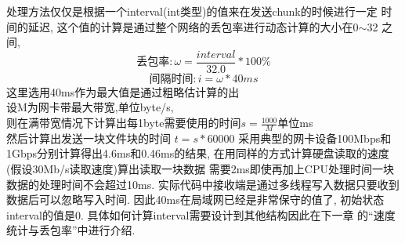 处理方法仅仅是根据一个interval(int类型)的值来在发送chunk的时候进行一定
时间的延迟, 这个值的计算是通过整个网络的丢包率进行动态计算的大小在0$\sim$32
之间,
\[\textrm{丢包率}:\omega = \frac{interval}{32.0} * 100\%\]
\[\textrm{间隔时间}:i = \omega * 40ms\]
这里选用40ms作为最大值是通过粗略估计算的出\\
设M为网卡带最大带宽,单位byte/s,\\
则在满带宽情况下计算出每1byte需要使用的时间$s = \frac{1000}{M}$单位ms\\
然后计算出发送一块文件块的时间 $t = s * 60000$
采用典型的网卡设备100Mbps和1Gbps分别计算得出4.6ms和0.46ms的结果,
在用同样的方式计算硬盘读取的速度(假设30Mb/s读取速度)算出读取一块数据
需要2ms即使再加上CPU处理时间一块数据的处理时间不会超过10ms. 
实际代码中接收端是通过多线程写入数据只要收到数据后可以忽略写入时间.
因此40ms在局域网已经是非常保守的值了, 初始状态interval的值是0.
具体如何计算interval需要设计到其他结构因此在下一章
的``速度统计与丢包率''中进行介绍.
